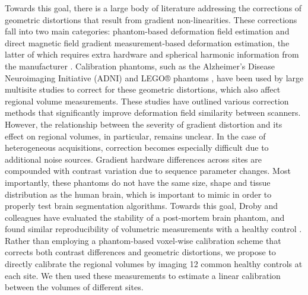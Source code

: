 Towards this goal, there is a large body of literature addressing the corrections of geometric distortions that result from gradient non-linearities. These corrections fall into two main categories: phantom-based deformation field estimation and direct magnetic field gradient measurement-based deformation estimation, the latter of which requires extra hardware and spherical harmonic information from the manufacturer \cite{fonov2010improved}. Calibration phantoms, such as the Alzheimer's Disease Neuroimaging Initiative (ADNI) \cite{gunter2009measurement} and LEGO® phantoms \cite{caramanos2010gradient}, have been used by large multisite studies to correct for these geometric distortions, which also affect regional volume measurements. These studies have outlined various correction methods that significantly improve deformation field similarity between scanners. However, the relationship between the severity of gradient distortion and its effect on regional volumes, in particular, remains unclear. In the case of heterogeneous acquisitions, correction becomes especially difficult due to additional noise sources. Gradient hardware differences across sites are compounded with contrast variation due to sequence parameter changes. Most importantly, these phantoms do not have the same size, shape and tissue distribution as the human brain, which is important to mimic in order to properly test brain segmentation algorithms. Towards this goal, Droby and colleagues have evaluated the stability of a post-mortem brain phantom, and found similar reproducibility of volumetric measurements with a healthy control \cite{droby2015human}. Rather than employing a phantom-based voxel-wise calibration scheme that corrects both contrast differences and geometric distortions, we propose to directly calibrate the regional volumes by imaging 12 common healthy controls at each site. We then used these measurements to estimate a linear calibration between the volumes of different sites.